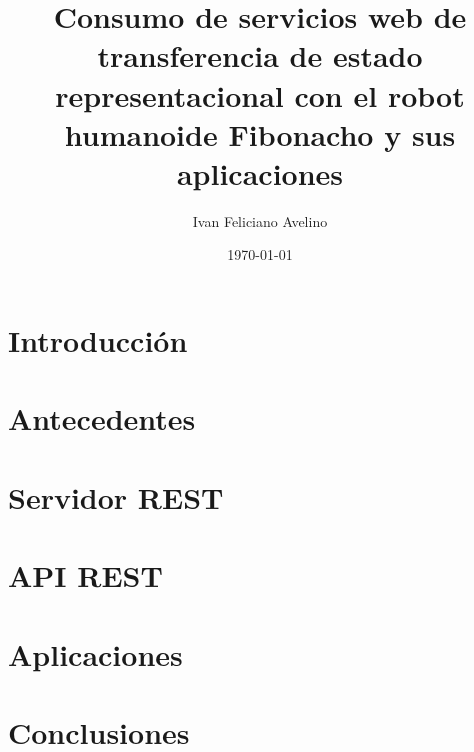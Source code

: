 \documentclass[spanish]{article}
\title{Consumo de servicios web de transferencia de estado representacional con el robot humanoide Fibonacho y sus aplicaciones}
\author{Ivan Feliciano Avelino}
\date{\today}
\begin{document}
\maketitle

\section{Introducción}

\section{Antecedentes}


\section{Servidor REST}

\section{API REST}

\section{Aplicaciones}


\section{Conclusiones}

\nocite{*}


\end{document}
